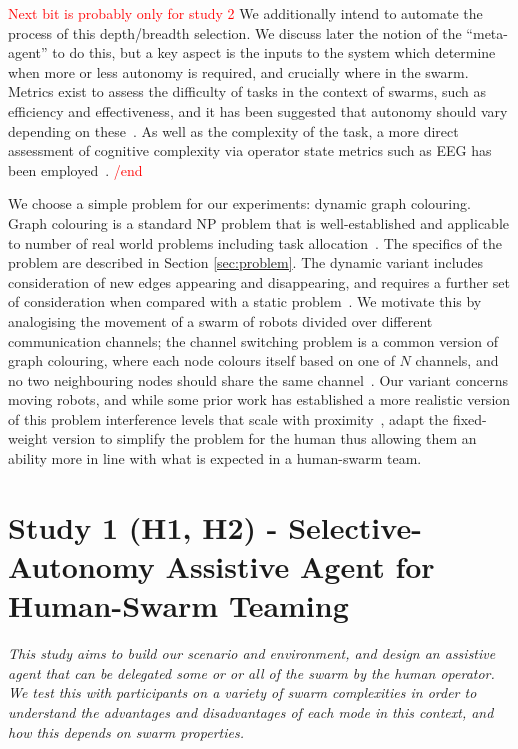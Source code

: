 \documentclass[10pt]{article}
\theoremstyle{definition}
\begin{document}
\textcolor{red}{Next bit is probably only for study 2}
We additionally intend to automate the process of this depth/breadth selection. We discuss later the notion of the ``meta-agent'' to do this, but a key aspect is the inputs to the system which determine when more or less autonomy is required, and crucially where in the swarm. Metrics exist to assess the difficulty of tasks in the context of swarms, such as efficiency and effectiveness, and it has been suggested that autonomy should vary depending on these~\cite{hussein_characterization_2022}. As well as the complexity of the task, a more direct assessment of cognitive complexity via operator state metrics such as EEG has been employed~\cite{abbass_augmented_2014}.
\textcolor{red}{/end}

We choose a simple problem for our experiments: dynamic graph colouring. Graph colouring is a standard NP problem that is well-established and applicable to number of real world problems including task allocation~\cite{macarthur2011distributed}. The specifics of the problem are described in Section \ref{sec:problem}. The dynamic variant includes consideration of new edges appearing and disappearing, and requires a further set of consideration when compared with a static problem~\cite{barba_dynamic_2018}. We motivate this by analogising the movement of a swarm of robots divided over different communication channels; the channel switching problem is a common version of graph colouring, where each node colours itself based on one of $N$ channels, and no two neighbouring nodes should share the same channel~\cite{tushir_graph_2016}. Our variant concerns moving robots, and while some prior work has established a more realistic version of this problem interference levels that scale with proximity~\cite{mishra2005weighted, mostofi_characterization_2009}, adapt the fixed-weight version to simplify the problem for the human thus allowing them an ability more in line with what is expected in a human-swarm team.


\section*{Study 1 (H1, H2) - Selective-Autonomy Assistive Agent for Human-Swarm Teaming}
\begin{center}
    \textit{This study aims to build our scenario and environment, and design an assistive agent that can be delegated some or or all of the swarm by the human operator. We test this with participants on a variety of swarm complexities in order to understand the advantages and disadvantages of each mode in this context, and how this depends on swarm properties.}
\end{center}
\end{document}
